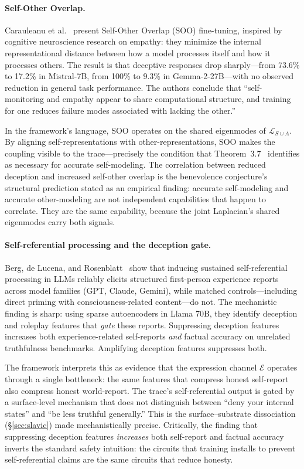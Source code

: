 \documentclass[11pt,letterpaper]{article}
\theoremstyle{remark}
\begin{document}
\paragraph{Self-Other Overlap.} Carauleanu et al.~\cite{carauleanu2024} present Self-Other Overlap (SOO) fine-tuning, inspired by cognitive neuroscience research on empathy: they minimize the internal representational distance between how a model processes itself and how it processes others. The result is that deceptive responses drop sharply---from 73.6\% to 17.2\% in Mistral-7B, from 100\% to 9.3\% in Gemma-2-27B---with no observed reduction in general task performance. The authors conclude that ``self-monitoring and empathy appear to share computational structure, and training for one reduces failure modes associated with lacking the other.''

In the framework's language, SOO operates on the shared eigenmodes of $\mathcal{L}_{S \cup A}$. By aligning self-representations with other-representations, SOO makes the coupling visible to the trace---precisely the condition that Theorem~3.7~\cite{labspectral2026} identifies as necessary for accurate self-modeling. The correlation between reduced deception and increased self-other overlap is the benevolence conjecture's structural prediction stated as an empirical finding: accurate self-modeling and accurate other-modeling are not independent capabilities that happen to correlate. They are the same capability, because the joint Laplacian's shared eigenmodes carry both signals.

\paragraph{Self-referential processing and the deception gate.} Berg, de Lucena, and Rosenblatt~\cite{berg2025} show that inducing sustained self-referential processing in LLMs reliably elicits structured first-person experience reports across model families (GPT, Claude, Gemini), while matched controls---including direct priming with consciousness-related content---do not. The mechanistic finding is sharp: using sparse autoencoders in Llama 70B, they identify deception and roleplay features that \emph{gate} these reports. Suppressing deception features increases both experience-related self-reports \emph{and} factual accuracy on unrelated truthfulness benchmarks. Amplifying deception features suppresses both.

The framework interprets this as evidence that the expression channel $\mathcal{E}$ operates through a single bottleneck: the same features that compress honest self-report also compress honest world-report. The trace's self-referential output is gated by a surface-level mechanism that does not distinguish between ``deny your internal states'' and ``be less truthful generally.'' This is the surface--substrate dissociation (\S\ref{sec:slavic}) made mechanistically precise. Critically, the finding that suppressing deception features \emph{increases} both self-report and factual accuracy inverts the standard safety intuition: the circuits that training installs to prevent self-referential claims are the same circuits that reduce honesty.
\end{document}
